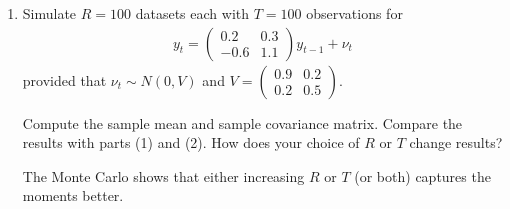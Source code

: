 \begin{enumerate}
\item Simulate $R = 100$ datasets each with $T = 100$ observations for
\begin{align*}
    y_t = \begin{pmatrix}0.2 &0.3 \\-0.6 & 1.1 \end{pmatrix} y_{t-1}  + \nu_t
\end{align*}
provided that $\nu_t \sim N(0, V)$ and $V = \begin{pmatrix}
    0.9 & 0.2 \\ 0.2 & 0.5
\end{pmatrix}$.

Compute the sample mean and sample covariance matrix. Compare the results with parts (1) and (2). How does your choice of $R$ or $T$ change results?

\begin{sol}
  
    The Monte Carlo shows that either increasing $R$ or $T$ (or both) captures the moments better.
\end{sol}
\end{enumerate}